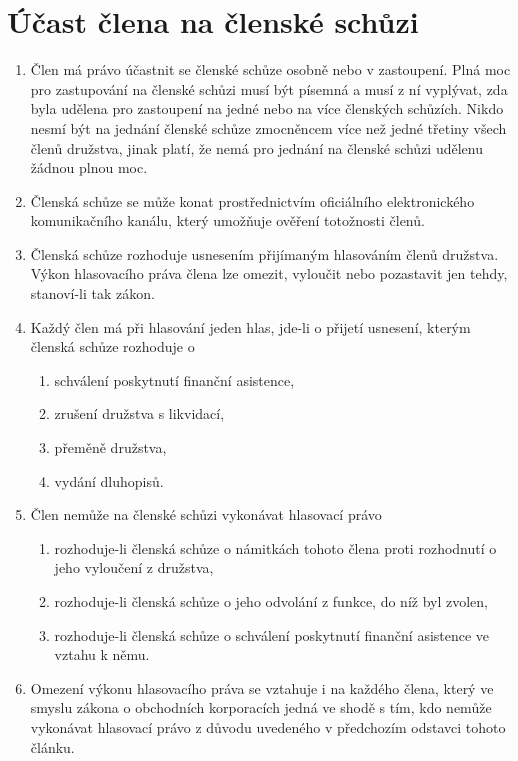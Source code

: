 \section{Účast člena na členské schůzi}
\begin{enumerate}
    \item Člen má právo účastnit se členské schůze osobně nebo v zastoupení. Plná moc pro zastupování na členské schůzi musí být písemná a musí z ní vyplývat, zda byla udělena pro zastoupení na jedné nebo na více členských schůzích. Nikdo nesmí být na jednání členské schůze zmocněncem více než jedné třetiny všech členů družstva, jinak platí, že nemá pro jednání na členské schůzi udělenu žádnou plnou moc.
    \item Členská schůze se může konat prostřednictvím oficiálního elektronického komunikačního kanálu, který umožňuje ověření totožnosti členů.
    \item Členská schůze rozhoduje usnesením přijímaným hlasováním členů družstva. Výkon hlasovacího práva člena lze omezit, vyloučit nebo pozastavit jen tehdy, stanoví-li tak zákon.
    \item Každý člen má při hlasování jeden hlas, jde-li o přijetí usnesení, kterým členská schůze rozhoduje o
    \begin{enumerate}[label=\alph*.]
        \item schválení poskytnutí finanční asistence,
        \item zrušení družstva s likvidací,
        \item přeměně družstva,
        \item vydání dluhopisů.
    \end{enumerate}
    \item Člen nemůže na členské schůzi vykonávat hlasovací právo
    \begin{enumerate}[label=\alph*.]
        \item rozhoduje-li členská schůze o námitkách tohoto člena proti rozhodnutí o jeho vyloučení z družstva,
        \item rozhoduje-li členská schůze o jeho odvolání z funkce, do níž byl zvolen,
        \item rozhoduje-li členská schůze o schválení poskytnutí finanční asistence ve vztahu k němu.
    \end{enumerate}
    \item Omezení výkonu hlasovacího práva se vztahuje i na každého člena, který ve smyslu zákona o obchodních korporacích jedná ve shodě s tím, kdo nemůže vykonávat hlasovací právo z důvodu uvedeného v předchozím odstavci tohoto článku.
\end{enumerate}

